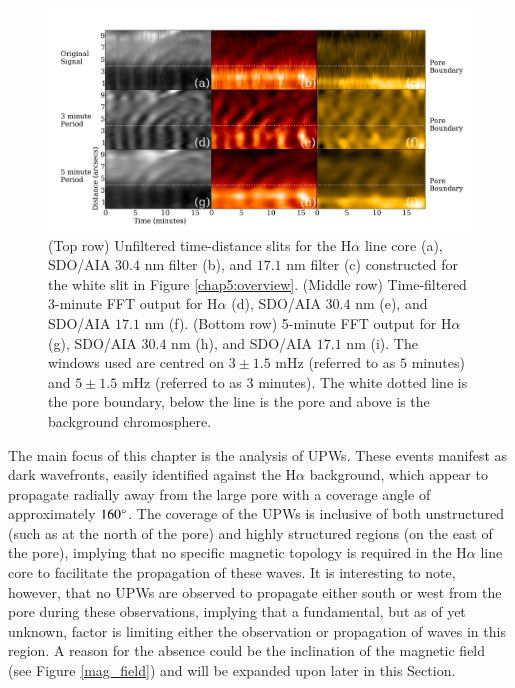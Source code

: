 	\begin{figure}
		\centering
		\includegraphics[width=\textwidth]{slits.pdf}
		\caption
		{
		(Top row) Unfiltered time-distance slits for the H$\alpha$ line core (a), SDO/AIA $30.4$ nm filter (b), and $17.1$ nm filter (c) constructed for the white slit in Figure \ref{chap5:overview}. (Middle row) Time-filtered 3-minute FFT output for H$\alpha$ (d), SDO/AIA $30.4$ nm (e), and SDO/AIA $17.1$ nm (f). (Bottom row) 5-minute FFT output for H$\alpha$ (g), SDO/AIA $30.4$ nm (h), and SDO/AIA $17.1$ nm (i).
		The windows used are centred on $3\pm1.5$ mHz (referred to as $5$ minutes) and $5\pm1.5$ mHz (referred to as $3$ minutes).
		The white dotted line is the pore boundary, below the line is the pore and above is the background chromosphere.
		}
		\label{fft_slit}
	\end{figure}

	The main focus of this chapter is the analysis of UPWs.
	These events manifest as dark wavefronts, easily identified against the H$\alpha$ background, which appear to propagate radially away from the large pore with a coverage angle of approximately $160\degree$.
	The coverage of the UPWs is inclusive of both unstructured (such as at the north of the pore) and highly structured regions (on the east of the pore), implying that no specific magnetic topology is required in the H$\alpha$ line core to facilitate the propagation of these waves.
	It is interesting to note, however, that no UPWs are observed to propagate either south or west from the pore during these observations, implying that a fundamental, but as of yet unknown, factor is limiting either the observation or propagation of waves in this region.
	A reason for the absence could be the inclination of the magnetic field (see Figure \ref{mag_field}) and will be expanded upon later in this Section.

